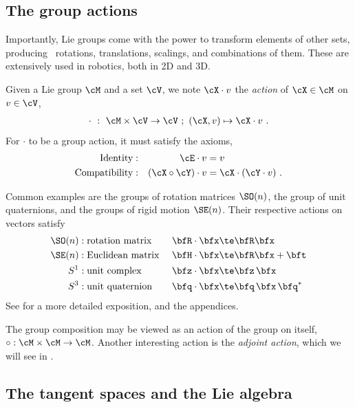 \subsection{The group actions}

Importantly, Lie groups come with the power to transform elements of other sets, producing \eg~rotations, translations, scalings, and combinations of them. 
These are extensively used in robotics, both in 2D and 3D.

Given a Lie group $\cM$ and a set $\cV$, we note $\cX\cdot v$ the \emph{action} of $\cX\in\cM$ on $v\in\cV$,
%
\begin{align}
\cdot~:~\cM\times\cV\to\cV~;~ (\cX,v)\mapsto\cX\cdot v
~.
\end{align}
%
For $\cdot$ to be a group action, it must satisfy the axioms, 
%
\begin{align}\label{equ:action}
\textrm{Identity} &:& \cE\cdot v &= v \\
\textrm{Compatibility} &:& (\cX\circ\cY)\cdot v &= \cX\cdot(\cY\cdot v)
~.
\end{align}


Common examples are the groups of rotation matrices $\SO(n)$, the group of unit quaternions, and the groups of rigid motion $\SE(n)$. 
Their respective actions on vectors satisfy
%
\begin{align*}
\SO(n) &:\textrm{rotation matrix } & \bfR\cdot\bfx &\te \bfR\bfx \\
\SE(n) &:\textrm{Euclidean matrix } & \bfH\cdot\bfx &\te \bfR\bfx + \bft \\
S^1  &:\textrm{unit complex } & \bfz\cdot\bfx &\te \bfz\,\bfx \\
S^3  &:\textrm{unit quaternion } & \bfq\cdot\bfx &\te \bfq\,\bfx\,\bfq^*
\end{align*}
%
See  for a more detailed exposition, and the appendices.



The group composition  may be viewed as an action of the group on itself, $\circ:\cM\times\cM\to\cM$.
Another interesting action is the \emph{adjoint action}, which we will see in .





\subsection{The tangent spaces and the Lie algebra}

